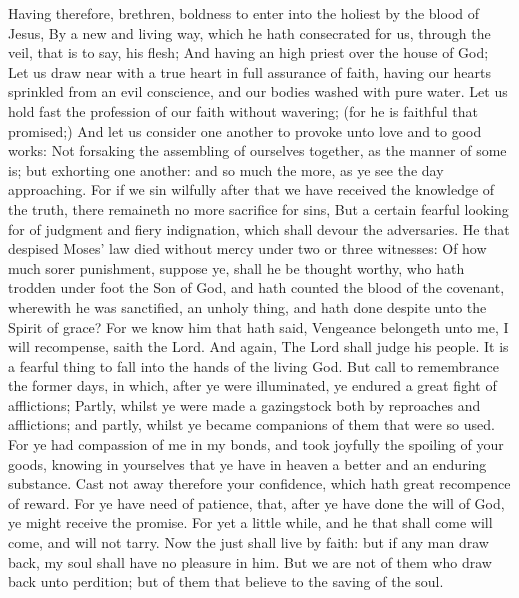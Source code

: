  Having therefore, brethren, boldness to enter into the
holiest by the blood of Jesus,  By a new and living way,
which he hath consecrated for us, through the veil, that is to say, his
flesh;  And having an high priest over the house of God;
 Let us draw near with a true heart in full assurance of
faith, having our hearts sprinkled from an evil conscience, and our
bodies washed with pure water.  Let us hold fast the
profession of our faith without wavering; (for he is faithful that
promised;)  And let us consider one another to provoke unto
love and to good works:  Not forsaking the assembling of
ourselves together, as the manner of some is; but exhorting one another:
and so much the more, as ye see the day approaching.  For
if we sin wilfully after that we have received the knowledge of the
truth, there remaineth no more sacrifice for sins,  But a
certain fearful looking for of judgment and fiery indignation, which
shall devour the adversaries.  He that despised Moses' law
died without mercy under two or three witnesses:  Of how
much sorer punishment, suppose ye, shall he be thought worthy, who hath
trodden under foot the Son of God, and hath counted the blood of the
covenant, wherewith he was sanctified, an unholy thing, and hath done
despite unto the Spirit of grace?  For we know him that
hath said, Vengeance belongeth unto me, I will recompense, saith the
Lord. And again, The Lord shall judge his people.  It is a
fearful thing to fall into the hands of the living God. 
But call to remembrance the former days, in which, after ye were
illuminated, ye endured a great fight of afflictions; 
Partly, whilst ye were made a gazingstock both by reproaches and
afflictions; and partly, whilst ye became companions of them that were
so used.  For ye had compassion of me in my bonds, and took
joyfully the spoiling of your goods, knowing in yourselves that ye have
in heaven a better and an enduring substance.  Cast not
away therefore your confidence, which hath great recompence of reward.
 For ye have need of patience, that, after ye have done the
will of God, ye might receive the promise.  For yet a
little while, and he that shall come will come, and will not tarry.
 Now the just shall live by faith: but if any man draw
back, my soul shall have no pleasure in him.  But we are
not of them who draw back unto perdition; but of them that believe to
the saving of the soul.

